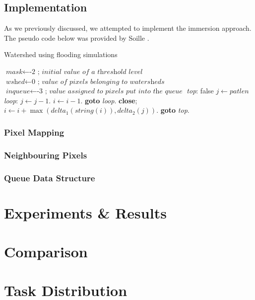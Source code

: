 \documentclass{article}
\begin{document}
\subsection{Implementation}
As we previously discussed, we attempted to implement the immersion approach. The pseudo code below was provided by Soille \cite{soilletestbook}.
\newline

\begin{algorithm}
\caption{Watershed using flooding simulations}\label{euclid}
\begin{algorithmic}[1]
\State $\textit{mask} \gets \text{-2  ;  }  \textit{initial value of a threshold level}$
\State $\textit{wshed} \gets \text{0  ;  }  \textit{value of pixels belonging to watersheds}$
\State $\textit{inqueue} \gets \text{-3  ;  } \textit{value assigned to pixels put into the queue}$
\BState \emph{top}:
 \Return false
\EndIf
\State $j \gets \textit{patlen}$
\BState \emph{loop}:
\State $j \gets j-1$.
\State $i \gets i-1$.
\State \textbf{goto} \emph{loop}.
\State \textbf{close};
\EndIf
\State $i \gets i+\max(\textit{delta}_1(\textit{string}(i)),\textit{delta}_2(j))$.
\State \textbf{goto} \emph{top}.
\EndProcedure
\end{algorithmic}
\end{algorithm}

\subsubsection{Pixel Mapping}
\subsubsection{Neighbouring Pixels}
\subsubsection{Queue Data Structure}

\section{Experiments & Results}


\section{Comparison}


\section{Task Distribution}
\end{document}
